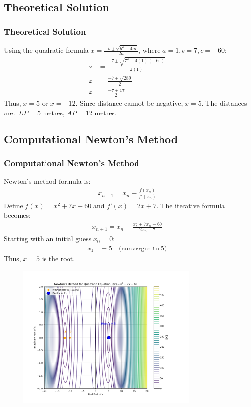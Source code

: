 \documentclass{beamer}
\theoremstyle{remark}
\numberwithin{equation}{section}
\begin{document}
	\subsection{Theoretical Solution}
	\begin{frame}
		\frametitle{Theoretical Solution}
		Using the quadratic formula \(x = \frac{-b \pm \sqrt{b^2 - 4ac}}{2a}\), where \(a = 1, b = 7, c = -60\):
		\begin{align}
			x &= \frac{-7 \pm \sqrt{7^2 - 4(1)(-60)}}{2(1)} \\
			x &= \frac{-7 \pm \sqrt{289}}{2} \\
			x &= \frac{-7 \pm 17}{2}
		\end{align}
		Thus, \(x = 5\) or \(x = -12\). Since distance cannot be negative, \(x = 5\).
		The distances are:\
		\(BP = 5\) metres, \(AP = 12\) metres.
		
	\end{frame}

	
	\subsection{Computational Newton's Method}
	\begin{frame}[allowframebreaks]
		\frametitle{Computational Newton's Method}
		Newton's method formula is:
		\begin{align}
			x_{n+1} = x_n - \frac{f(x_n)}{f'(x_n)}
		\end{align}
		Define \(f(x) = x^2 + 7x - 60\) and \(f'(x) = 2x + 7\). The iterative formula becomes:
		\begin{align}
			x_{n+1} = x_n - \frac{x_n^2 + 7x_n - 60}{2x_n + 7}
		\end{align}
		Starting with an initial guess \(x_0 = 0\):
		\begin{align}
			x_1 &= 5 \quad \text{(converges to 5)}
		\end{align}
		Thus, \(x = 5\) is the root.\\
		
		\begin{figure}[h]
			\centering
			\includegraphics[width=0.8\textwidth]{fig2.png}
		\end{figure}
		
	\end{frame}
	
\end{document}
